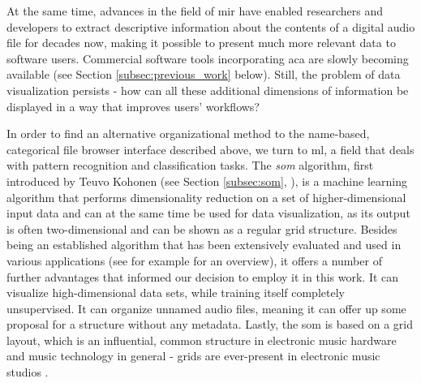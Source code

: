 At the same time, advances in the field of \gls{mir} have enabled researchers
and developers to extract descriptive information about the contents
of a digital audio file for decades now, making it possible to present much
more relevant data to software users. Commercial software tools incorporating
\gls{aca} are slowly becoming available (see Section \ref{subsec:previous_work}
below). Still, the problem of data visualization persists - how can all these
additional dimensions of information be displayed in a way that improves users'
workflows?

\smallskip

In order to find an alternative organizational method to the name-based,
categorical file browser interface described above, we turn to \gls{ml},
a field that deals with pattern recognition and classification tasks. The
\textit{\gls{som}} algorithm, first introduced by Teuvo Kohonen (see Section
\ref{subsec:som}, \citet{kohonen1990}), is a machine learning algorithm that
performs dimensionality reduction on a set of higher-dimensional input data and
can at the same time be used for data visualization, as its output is often
two-dimensional and can be shown as a regular grid structure. Besides being an
established algorithm that has been extensively evaluated and used in various
applications (see for example \citet[p.1476]{kohonen1990} for an overview), it
offers a number of further advantages that informed our decision to employ it
in this work. It can visualize high-dimensional data sets, while training itself
completely unsupervised. It can organize unnamed audio files, meaning it can
offer up some proposal for a structure without any metadata. Lastly, the
\gls{som} is based on a grid layout, which is an influential, common structure
in electronic music hardware and music technology in general - grids are
ever-present in electronic music studios \citep{adeney2009}.


